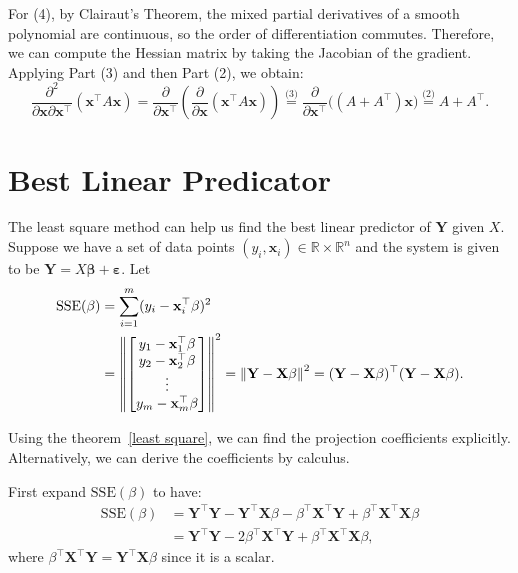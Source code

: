 \documentclass[12pt]{article}
\begin{document}
\begin{pfbox}
For (4), by Clairaut's Theorem, the mixed partial derivatives of a smooth polynomial are continuous, so the order of differentiation commutes. Therefore, we can compute the Hessian matrix by taking the Jacobian of the gradient. Applying Part (3) and then Part (2), we obtain:
$$ \frac{\partial^2}{\partial \mathbf{x} \partial \mathbf{x}^\top} (\mathbf{x}^\top A \mathbf{x}) = \frac{\partial}{\partial \mathbf{x}^\top} \left( \frac{\partial}{\partial \mathbf{x}} (\mathbf{x}^\top A \mathbf{x}) \right) \stackrel{\text{(3)}}{=} \frac{\partial}{\partial \mathbf{x}^\top} \Big( (A + A^\top)\mathbf{x} \Big) \stackrel{\text{(2)}}{=} A + A^\top. $$
\end{pfbox}


\section{Best Linear Predicator}

The least square method can help us find the best linear predictor of $\mathbf{Y}$ given $X$.
Suppose we have a set of data points $(y_i,\mathbf{x}_i)\in\mathbb{R}\times\mathbb{R}^n$ and the system is given to be $\mathbf{Y}=X\boldsymbol{\beta}+\boldsymbol{\varepsilon}$.
Let 
\begin{align*}
    \mathrm{SSE}(\beta) &= \sum_{i=1}^m (y_i - \mathbf{x}_i^\top\beta)^2 \\
    &= \left\| \begin{bmatrix} y_1 - \mathbf{x}_1^\top\beta \\ y_2 - \mathbf{x}_2^\top\beta \\ \vdots \\ y_m - \mathbf{x}_m^\top\beta \end{bmatrix} \right\|^2 
    = \left\lVert \mathbf{Y} - \mathbf{X}\beta \right\rVert^2
    = (\mathbf{Y} - \mathbf{X}\beta)^\top (\mathbf{Y} - \mathbf{X}\beta).
\end{align*}

Using the theorem~\eqref{least square}, we can find the projection coefficients explicitly.
Alternatively, we can derive the coefficients by calculus. 

First expand $\mathrm{SSE}(\beta)$ to have:
\begin{align*}
    \mathrm{SSE}(\beta) &= \mathbf{Y}^\top \mathbf{Y} - \mathbf{Y}^\top \mathbf{X}\beta - \beta^\top \mathbf{X}^\top \mathbf{Y} + \beta^\top \mathbf{X}^\top \mathbf{X}\beta \\
             &= \mathbf{Y}^\top \mathbf{Y} - 2\beta^\top \mathbf{X}^\top \mathbf{Y} + \beta^\top \mathbf{X}^\top \mathbf{X}\beta,
\end{align*}
where $\beta^\top \mathbf{X}^\top \mathbf{Y} = \mathbf{Y}^\top \mathbf{X}\beta$ since it is a scalar.  
\end{document}
